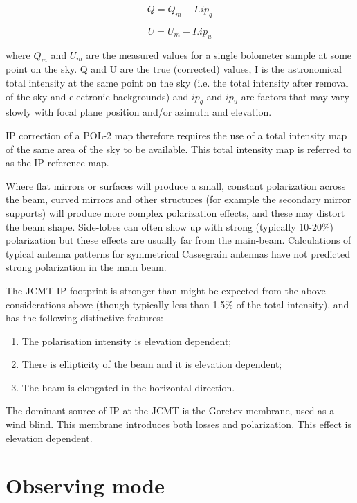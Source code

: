 \begin{equation}
Q = Q_{m} - I. ip_{q}
\end{equation}

\begin{equation}
U = U_{m} - I. ip_{u}
\end{equation}

where $Q_{m}$ and $U_{m}$ are the measured values for a single bolometer sample at
some point on the sky. Q and U are the true (corrected) values, I is the astronomical
total intensity at the same point on the sky (i.e. the total intensity after removal of
the sky and electronic backgrounds) and $ip_{q}$  and $ip_{u}$  are factors that may vary
slowly with focal plane position and/or azimuth and elevation.

IP correction of a POL-2 map therefore requires the use of a total intensity map of the same area
of the sky to be available. This total intensity map is referred to as the IP reference map.

Where flat mirrors or surfaces will produce a small, constant polarization across the beam,
curved mirrors and other structures (for example the secondary mirror supports) will
produce more complex polarization effects, and these may distort the beam shape.
Side-lobes can often show up with strong (typically 10-20\%) polarization but these
effects are usually far from the main-beam. Calculations of typical antenna patterns
for symmetrical Cassegrain antennas have not predicted strong polarization in the main beam.

The JCMT IP footprint is stronger than might be expected from the above considerations above (though typically less than 1.5\% of
the total intensity), and has the following distinctive features:

\begin{enumerate}\itemsep-0.2em
\item The polarisation intensity is elevation dependent;
\item There is ellipticity of the beam and it is elevation dependent;
\item The beam is elongated in the horizontal direction.
\end{enumerate}

The dominant source of IP at the JCMT is the Goretex membrane, used as a wind blind.
This membrane introduces both losses and polarization. This effect is elevation dependent.


\section{Observing mode}
\label{sec:mmodes}

